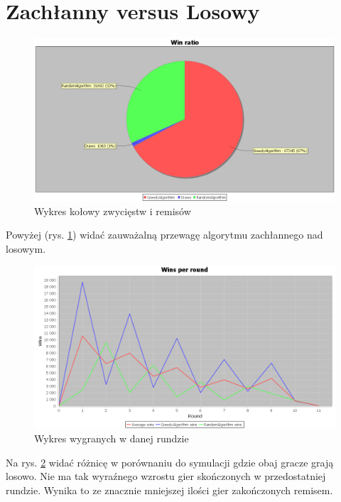 \section{Zachłanny versus Losowy}

\begin{figure}[H]
	\centering
	\includegraphics[width=\textwidth]{Resources/GVsR/GVsRwin.PNG}
	\caption{Wykres kołowy zwycięstw i remisów} 
	\label{fig:GVsRwin}
\end{figure}

Powyżej (rys. \ref{fig:GVsRwin}) widać zauważalną przewagę algorytmu zachłannego nad losowym.

\begin{figure}[H]
	\centering
	\includegraphics[width=\textwidth]{Resources/GVsR/GVsRroundwin.PNG}
	\caption{Wykres wygranych w danej rundzie} 
	\label{fig:GVsRroundwin}
\end{figure}

Na rys. \ref{fig:GVsRroundwin} widać różnicę w porównaniu do symulacji gdzie obaj gracze grają losowo. Nie ma tak wyraźnego wzrostu gier skończonych w przedostatniej rundzie. Wynika to ze znacznie mniejszej ilości gier zakończonych remisem.

